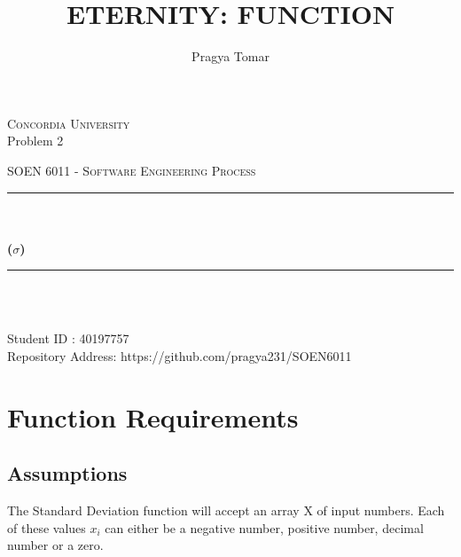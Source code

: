 \documentclass[12pt]{report}
\title{ETERNITY: FUNCTION}
\author{Pragya Tomar}
\date{}
\makeatletter
\let\thetitle\@title
\let\theauthor\@author
\makeatother
\begin{document}
\begin{titlepage}
	\centering
    \vspace*{1 cm}
\begin{center}    \textsc{\Large Concordia University}\\[2.5 cm]
{Problem 2 }\\[0.4 cm]
\end{center}
	\textsc{\Large  SOEN 6011 - Software Engineering Process }\\[1 cm]
	\rule{\linewidth}{0.5 mm} \\[0.4 cm]
	{ \huge \textbf \thetitle}\\[0.5 cm]
	{ \huge \textbf{($\sigma$)}}
	\rule{\linewidth}{0.5 mm} \\[1.0 cm]

	
\begin{center}   {\Large \textbf{\theauthor}} \\[1 cm]
                 {\large Student ID : 40197757 }\\[0.4 cm]
                 {\large Repository Address: https://github.com/pragya231/SOEN6011}
\end{center}
	
\end{titlepage}

\tableofcontents
\pagebreak

\renewcommand{\thesection}{\arabic{section}}


\section{\Large \vspace{0.3 cm}Function Requirements}

\subsection{\Large \vspace{0.3 cm}Assumptions}

\normalsize{The Standard Deviation function will accept an array X of input numbers. Each of these values $x_i$ can either be a negative number, positive number, decimal number or a zero.}
\end{document}
